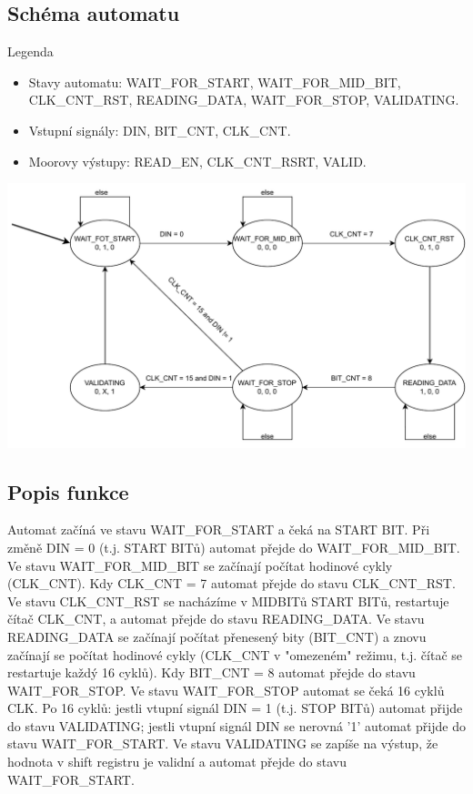 \documentclass[a4paper, 11pt]{article}
\begin{document}
\subsection{Schéma automatu}
Legenda
\begin{itemize}
  \item Stavy automatu: WAIT\_FOR\_START, WAIT\_FOR\_MID\_BIT, CLK\_CNT\_RST, READING\_DATA, WAIT\_FOR\_STOP, VALIDATING.
  \item Vstupní signály: DIN, BIT\_CNT, CLK\_CNT.
  \item Moorovy výstupy: READ\_EN, CLK\_CNT\_RSRT, VALID.
\end{itemize}
\includegraphics[width=\textwidth,height=\textheight,keepaspectratio]{INC_FSM.pdf}
\subsection{Popis funkce}
Automat začíná ve stavu WAIT\_FOR\_START a čeká na START BIT. Při změně {DIN = 0} (t.j. START BITů) automat přejde do WAIT\_FOR\_MID\_BIT. Ve stavu WAIT\_FOR\_MID\_BIT se začínají počítat hodinové cykly (CLK\_CNT). Kdy CLK\_CNT = 7 automat přejde do stavu CLK\_CNT\_RST. Ve stavu CLK\_CNT\_RST se nacházíme v MIDBITů START BITů, restartuje čítač CLK\_CNT, a automat přejde do stavu READING\_DATA. Ve stavu READING\_DATA se začínají počítat přenesený bity (BIT\_CNT) a znovu začínají se počítat hodinové cykly  (CLK\_CNT v "omezeném" režimu, t.j. čítač se restartuje každý 16 cyklů). Kdy BIT\_CNT = 8 automat přejde do stavu WAIT\_FOR\_STOP. Ve stavu WAIT\_FOR\_STOP automat se čeká 16 cyklů CLK. Po 16 cyklů: jestli vtupní signál DIN = 1 (t.j. STOP BITů) automat přijde do stavu VALIDATING; jestli vtupní signál DIN se nerovná '1' automat přijde do stavu WAIT\_FOR\_START. Ve stavu VALIDATING se zapíše na výstup, že  hodnota v shift registru je validní a automat přejde do stavu WAIT\_FOR\_START.
\newpage
\end{document}
